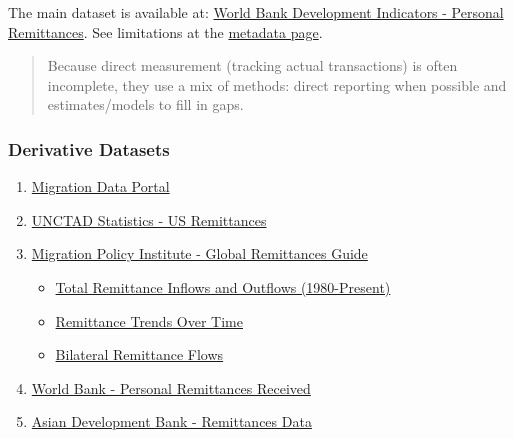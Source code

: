 \documentclass[
  11pt,
]{article}
\providecommand{\tightlist}{%
  \setlength{\itemsep}{0pt}\setlength{\parskip}{0pt}}
\begin{document}
The main dataset is available at:
\href{https://databank.worldbank.org/metadataglossary/world-development-indicators/series/BM.TRF.PWKR.CD.DT}{World
Bank Development Indicators - Personal Remittances}. See limitations at
the
\href{https://databank.worldbank.org/metadataglossary/world-development-indicators/series/BM.TRF.PWKR.CD.DT}{metadata
page}.

\begin{quote}
Because direct measurement (tracking actual transactions) is often
incomplete, they use a mix of methods: direct reporting when possible
and estimates/models to fill in gaps.
\end{quote}

\subsubsection{Derivative Datasets}\label{derivative-datasets}

\begin{enumerate}
\def\labelenumi{\arabic{enumi}.}
\tightlist
\item
  \href{https://www.migrationdataportal.org/data-catalogue}{Migration
  Data Portal}
\item
  \href{https://unctadstat.unctad.org/datacentre/reportInfo/US.Remittances}{UNCTAD
  Statistics - US Remittances}
\item
  \href{https://www.migrationpolicy.org/programs/data-hub/global-remittances-guide}{Migration
  Policy Institute - Global Remittances Guide}

  \begin{itemize}
  \tightlist
  \item
    \href{https://www.migrationpolicy.org/programs/data-hub/charts/total-remittance-inflows-and-outflows-1980-present?width=1000&height=850&iframe=true}{Total
    Remittance Inflows and Outflows (1980-Present)}
  \item
    \href{https://www.migrationpolicy.org/programs/data-hub/charts/remittance-trends-over-time?width=1000&height=850&iframe=true}{Remittance
    Trends Over Time}
  \item
    \href{https://www.migrationpolicy.org/programs/data-hub/charts/bilateral-remittance-flows?width=1000&height=850&iframe=true}{Bilateral
    Remittance Flows}
  \end{itemize}
\item
  \href{https://data.worldbank.org/indicator/bx.trf.pwkr.cd.dt}{World
  Bank - Personal Remittances Received}
\item
  \href{https://data.adb.org/taxonomy/term/130}{Asian Development Bank -
  Remittances Data}
\end{enumerate}
\end{document}
